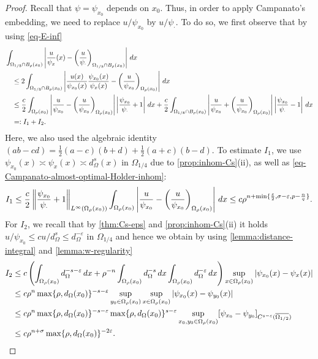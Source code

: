 \documentclass[11pt,reqno]{amsart}
\theoremstyle{plain}
\theoremstyle{definition}
\numberwithin{equation}{section}
\newcommand{\eps}{\varepsilon}
\newcommand{\1}{\mathbbm{1}}
\renewcommand{\d}{\textnormal{\,d}}
\begin{document}
\begin{proof}
Recall that $\psi = \psi_{x_0}$ depends on $x_0$. Thus, in order to apply Campanato's embedding, we need to replace $u/\psi_{x_0}$ by $u/\psi_{\cdot}$. To do so, we first observe that by using \eqref{eq-E-inf}
\begin{align*}
& \int_{\Omega_{1/8} \cap B_\rho(x_0)} \left| \frac{u}{\psi_x}(x) - \left( \frac{u}{\psi_{\cdot}} \right)_{\Omega_{1/8} \cap B_{\rho}(x_0)} \right| \d x \\
&\quad \le 2\int_{\Omega_{1/8} \cap B_\rho(x_0)} \left| \frac{u(x)}{\psi_{x_0}(x)}\frac{\psi_{x_0}(x)}{\psi_x(x)} - \left( \frac{u}{\psi_{x_0}} \right)_{\Omega_{\rho}(x_0)} \right| \d x \\
&\quad \le \frac{c}{2} \int_{\Omega_{\rho}(x_0)} \left| \frac{u}{\psi_{x_0}} - \left( \frac{u}{\psi_{x_0}} \right)_{\Omega_{\rho}(x_0)} \right| \left| \frac{\psi_{x_0}}{\psi_{\cdot}} + 1 \right| \d x + \frac{c}{2} \int_{\Omega_{1/8} \cap B_\rho(x_0)} \left| \frac{u}{\psi_{x_0}} + \left( \frac{u}{\psi_{x_0}} \right)_{\Omega_{\rho}(x_0)} \right| \left| \frac{\psi_{x_0}}{\psi_{\cdot}} - 1 \right| \d x  \\
&\quad =: I_1 + I_2.
\end{align*}
Here, we also used the algebraic identity $(ab-cd) = \frac{1}{2}(a-c)(b+d) + \frac{1}{2}(a+c)(b-d)$. To estimate $I_1$, we use $\psi_{x_0}(x) \asymp \psi_x(x) \asymp d_{\Omega}^s(x)$ in $\Omega_{1/4}$ due to \autoref{prop:inhom-Cs}(ii), as well as \eqref{eq-Campanato-almost-optimal-Holder-inhom}:
\begin{align*}
I_1 \le \frac{c}{2} \left \Vert \frac{\psi_{x_0}}{\psi_{\cdot}}+1 \right\Vert_{L^{\infty}(\Omega_{\rho}(x_0))} \int_{\Omega_{\rho}(x_0)} \left|\frac{u}{\psi_{x_0}} - \left( \frac{u}{\psi_{x_0}} \right)_{\Omega_{\rho}(x_0)} \right| \d x \le c \rho^{n+\min\{\frac{\eps}{2} , \sigma-\varepsilon, p - \frac{n}{q} \}}.
\end{align*}
For $I_2$, we recall that by \autoref{thm:Cs-eps} and \autoref{prop:inhom-Cs}(ii) it holds $u/\psi_{x_0} \le c u/d^s_{\Omega} \le d_{\Omega}^{-\eps}$ in $\Omega_{1/4}$ and hence we obtain by using \autoref{lemma:distance-integral} and \autoref{lemma:w-regularity}
\begin{align*}
    I_2
    &\leq c \left( \int_{\Omega_\rho(x_0)} d_\Omega^{-s-\varepsilon} \d x + \rho^{-n} \int_{\Omega_\rho(x_0)} d_\Omega^{-s} \d x\int_{\Omega_\rho(x_0)} d_\Omega^{-\varepsilon} \d x\right) \sup_{x \in \Omega_\rho(x_0)} |\psi_{x_0}(x)-\psi_x(x)| \\
    &\leq c \rho^{n} \max\{\rho, d_{\Omega}(x_0)\}^{-s-\eps} \sup_{y_0 \in \Omega_\rho(x_0)} \sup_{x \in \Omega_\rho(x_0)} |\psi_{x_0}(x)-\psi_{y_0}(x)| \\
    &\leq c \rho^{n} \max\{\rho, d_{\Omega}(x_0)\}^{-s-\eps} \max\{ \rho , d_{\Omega}(x_0) \}^{s-\varepsilon} \sup_{x_0,y_0 \in \Omega_{\rho}(x_0)} [\psi_{x_0} - \psi_{y_0}]_{C^{s-\eps}(\overline{\Omega_{1/2}})} \\
    &\leq c\rho^{n+\sigma} \max\{\rho , d_{\Omega}(x_0)\}^{-2\eps}.
\end{align*}


\end{proof}
\end{document}
